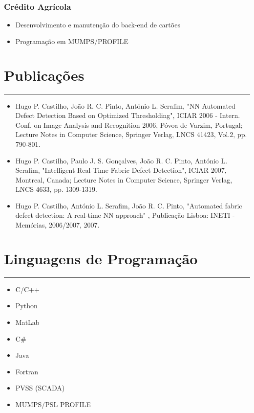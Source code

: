 \documentclass[a4paper,portuguese]{article}
\newcommand{\topic}[1]{
\section*{#1} \vspace{-6mm}
\rule{\columnwidth}{.25mm}
}
\begin{document}
    \subsubsection*{Crédito Agrícola}
    \begin{itemize}
    \setlength{\itemsep}{-1mm}
        \item[] Desenvolvimento e manutenção do back-end de cartões
        \item[] Programação em MUMPS/PROFILE
    \end{itemize}

\topic{Publicações}
\begin{itemize}
    \item[] Hugo P. Castilho, João R. C. Pinto, António L. Serafim, "NN
Automated Defect Detection Based on Optimized Thresholding", ICIAR 2006 -
Intern. Conf. on Image Analysis and Recognition 2006, Póvoa
de Varzim, Portugal; Lecture Notes in Computer Science, Springer Verlag,
LNCS 41423, Vol.2, pp. 790-801.
    \item[] Hugo P. Castilho, Paulo J. S. Gonçalves, João R. C. Pinto, António
L. Serafim, "Intelligent Real-Time Fabric Defect Detection", ICIAR
2007, Montreal, Canada; Lecture Notes in Computer Science, Springer Verlag,
LNCS 4633, pp. 1309-1319.
    \item[] Hugo P. Castilho, António L. Serafim, João R. C. Pinto, "Automated
fabric defect detection: A real-time NN approach" , Publicação Lisboa: INETI - 
Memórias, 2006/2007, 2007.
\end{itemize}

\topic{Linguagens de Programação}
\begin{itemize}
\setlength{\itemsep}{-1mm}
    \item C/C++
    \item Python
    \item MatLab
    \item C\#
    \item Java
    \item Fortran
    \item PVSS (SCADA)
    \item MUMPS/PSL PROFILE
\end{itemize}
\end{document}

